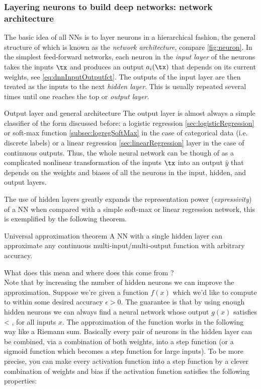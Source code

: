 \subsubsection{Layering neurons to build deep networks: network architecture}
\label{subsubsec:dnnNetworkArchitecture}
The basic idea of all NNs is to layer neurons in a hierarchical fashion, the general structure of which is known as the \emph{network architecture}, compare \ref{fig:neuron}. In the simplest feed-forward networks, each neuron in the \emph{input layer} of the neurons takes the inputs $\tx$ and produces an output $a_i(\tx)$ that depends on its current weights, see \ref{eq:dnnInputOutputfct}. The outputs of the input layer are then treated as the inputs to the next \emph{hidden layer}. This is usually repeated several times until one reaches the top or \emph{output layer}.
\begin{mybox}{Output layer and general architecture}
	The output layer is almost always a simple classifier of the form discussed before: a logistic regression \ref{sec:logisticRegression} or soft-max function \ref{subsec:logregSoftMax} in the case of categorical data (i.e. discrete labels) or a linear regression \ref{sec:linearRegression} layer in the case of continuous outputs. Thus, the whole neural network can be though of as a complicated nonlinear transformation of the inputs $\tx$ into an output $\hat{y}$ that depends on the weights and biases of all the neurons in the input, hidden, and output layers.
\end{mybox}
The use of hidden layers greatly expands the representation power (\emph{expressivity}) of a NN when compared with a simple soft-max or linear regression network, this is exemplified by the following theorem.
\begin{mybox}{Universal approximation theorem}
	A NN with a single hidden layer can approximate any continuous multi-input/multi-output function with arbitrary accuracy.
\end{mybox}
What does this mean and where does this come from ?\\
Note that by increasing the number of hidden neurons we can improve the approximation. Suppose we're given a function $f(x)$ which we'd like to compute to within some desired accuracy $ϵ>0$. The guarantee is that by using enough hidden neurons we can always find a neural network whose output $g(x)$ satisfies 
 \bse 
  < \epsilon,
 \ese 
  for all inputs $x$.
The approximation of the function works in the following way like a Riemann sum. Basically every pair of neurons in the hidden layer can be combined, via a combination of both weights, into a step function (or a sigmoid function which becomes a step function for large inputs). To be more precise, you can make every activation function into a step function by a clever combination of weights and bias if the activation function satisfies the following properties:\\
